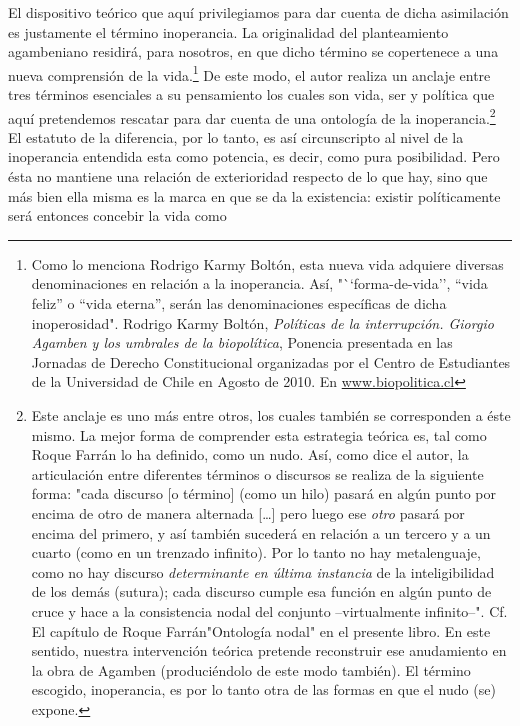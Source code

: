 \documentclass{book}
\begin{document}
El dispositivo teórico que aquí privilegiamos para dar cuenta de dicha
asimilación es justamente el término inoperancia. La originalidad del
planteamiento agambeniano residirá, para nosotros, en que dicho término
se copertenece a una nueva comprensión de la vida.\footnote{Como lo
  menciona Rodrigo Karmy Boltón, esta nueva vida adquiere diversas
  denominaciones en relación a la inoperancia. Así, "``forma-de-vida'',
  ``vida feliz'' o ``vida eterna'', serán las denominaciones específicas
  de dicha inoperosidad". Rodrigo Karmy Boltón, \emph{Políticas de la
  interrupción. Giorgio Agamben y los umbrales de la biopolítica},
  Ponencia presentada en las Jornadas de Derecho Constitucional
  organizadas por el Centro de Estudiantes de la Universidad de Chile en
  Agosto de 2010. En
  \href{http://www.biopolitica.cl/}{www.biopolitica.cl}} De este modo,
el autor realiza un anclaje entre tres términos esenciales a su
pensamiento los cuales son vida, ser y política que aquí pretendemos
rescatar para dar cuenta de una ontología de la inoperancia.\footnote{Este
  anclaje es uno más entre otros, los cuales también se corresponden a
  éste mismo. La mejor forma de comprender esta estrategia teórica es,
  tal como Roque Farrán lo ha definido, como un nudo. Así, como dice el
  autor, la articulación entre diferentes términos o discursos se
  realiza de la siguiente forma: "cada discurso {[}o término{]} (como un
  hilo) pasará en algún punto por encima de otro de manera alternada
  {[}\ldots{]} pero luego ese \emph{otro} pasará por encima del primero,
  y así también sucederá en relación a un tercero y a un cuarto (como en
  un trenzado infinito). Por lo tanto no hay metalenguaje, como no hay
  discurso \emph{determinante en última instancia} de la inteligibilidad
  de los demás (sutura); cada discurso cumple esa función en algún punto
  de cruce y hace a la consistencia nodal del conjunto --virtualmente
  infinito--". Cf. El capítulo de Roque Farrán"Ontología nodal" en el
  presente libro. En este sentido, nuestra intervención teórica pretende
  reconstruir ese anudamiento en la obra de Agamben (produciéndolo de
  este modo también). El término escogido, inoperancia, es por lo tanto
  otra de las formas en que el nudo (se) expone.} El estatuto de la
diferencia, por lo tanto, es así circunscripto al nivel de la
inoperancia entendida esta como potencia, es decir, como pura
posibilidad. Pero ésta no mantiene una relación de exterioridad respecto
de lo que hay, sino que más bien ella misma es la marca en que se da la
existencia: existir políticamente será entonces concebir la vida como
\end{document}
